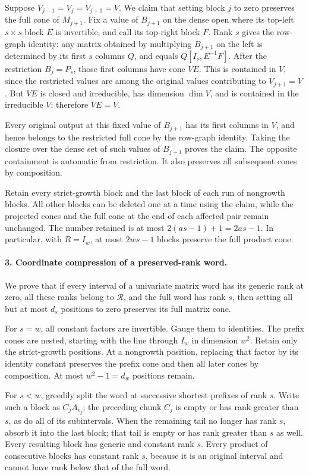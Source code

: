 Suppose $V_{j-1}=V_j=V_{j+1}=V$.  We claim that setting
block $j$ to zero preserves the full cone of $M_{j+1}$.
Fix a value of $B_{j+1}$ on the dense open where its top-left
$s\times s$ block $E$ is invertible, and call its top-right
block $F$.  Rank $s$ gives the row-graph identity: any matrix
obtained by multiplying $B_{j+1}$ on the left is determined
by its first $s$ columns $Q$, and equals $Q[I_s,E^{-1}F]$.
After the restriction $B_j=P_s$, those first columns have
cone $VE$.  This is contained in $V$, since the restricted
values are among the original values contributing to
$V_{j+1}=V$.  But $VE$ is closed and irreducible, has
dimension $\dim V$, and is contained in the irreducible $V$;
therefore $VE=V$.

Every original output at this fixed value of $B_{j+1}$ has
its first columns in $V$, and hence belongs to the restricted
full cone by the row-graph identity.  Taking the closure over
the dense set of such values of $B_{j+1}$ proves the claim.
The opposite containment is automatic from restriction.
It also preserves all subsequent cones by composition.

Retain every strict-growth block and the last block of each
run of nongrowth blocks.  All other blocks can be deleted
one at a time using the claim, while the projected cones
and the full cone at the end of each affected pair remain
unchanged.  The number retained is at most
$2(as-1)+1=2as-1$.  In particular, with $R=I_w$, at most
$2ws-1$ blocks preserve the full product cone.

\paragraph{3. Coordinate compression of a preserved-rank word.}
We prove that if every interval of a univariate matrix word
has its generic rank at zero, all these ranks belong to
$\mathcal R$, and the full word has rank $s$, then setting
all but at most $d_s$ positions to zero preserves its full
matrix cone.

For $s=w$, all constant factors are invertible.  Gauge them
to identities.  The prefix cones are nested, starting with
the line through $I_w$ in dimension $w^2$.  Retain only the
strict-growth positions.  At a nongrowth position, replacing
that factor by its identity constant preserves the prefix
cone and then all later cones by composition.  At most
$w^2-1=d_w$ positions remain.

For $s<w$, greedily split the word at successive shortest
prefixes of rank $s$.  Write such a block as $C_jA_{e_j}$;
the preceding chunk $C_j$ is empty or has rank greater
than $s$, as do all of its subintervals.  When the remaining
tail no longer has rank $s$, absorb it into the last block;
that tail is empty or has rank greater than $s$ as well.
Every resulting block has generic and constant rank $s$.
Every product of consecutive blocks has constant rank $s$,
because it is an original interval and cannot have rank
below that of the full word.

